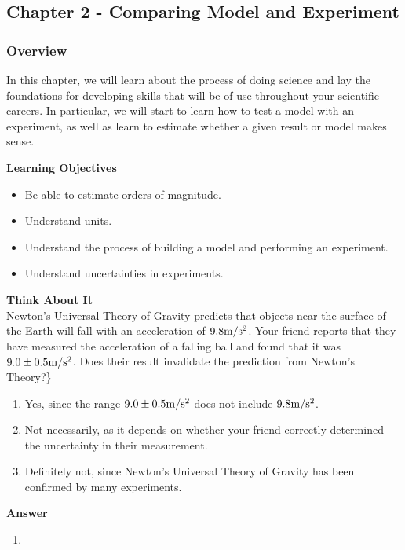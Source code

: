 \subsection{Chapter 2 - Comparing Model and Experiment}

\subsubsection{Overview}\label{chap:modelandexperiment}

In this chapter, we will learn about the process of doing science and lay the foundations for developing skills that will be of use throughout your scientific careers. In particular, we will start to learn how to test a model with an experiment, as well as learn to estimate whether a given result or model makes sense.

\begin{framed}
\textbf{Learning Objectives}\\
\begin{itemize}
\item Be able to estimate orders of magnitude.
\item Understand units.
\item Understand the process of building a model and performing an experiment.
\item Understand uncertainties in experiments.
\end{itemize}
\end{framed}

\begin{framed}
\textbf{Think About It}\\
Newton's Universal Theory of Gravity predicts that objects near the surface of the Earth will fall with an acceleration of $9.8{\rm m/s^2}$. Your friend reports that they have measured the acceleration of a falling ball and found that it was $9.0\pm 0.5 {\rm m/s^2}$. Does their result invalidate the prediction from Newton's Theory?\}

\begin{enumerate}
\item Yes, since the range $9.0\pm 0.5 {\rm m/s^2}$ does not include $9.8 {\rm m/s^2}$.
\item Not necessarily, as it depends on whether your friend correctly determined the uncertainty in their measurement.
\item Definitely not, since Newton's Universal Theory of Gravity has been confirmed by many experiments.
\end{enumerate}

\begin{framed}
\textbf{Answer}\\
\begin{enumerate}[resume]
\item
\end{enumerate}
\end{framed}
\end{framed}

